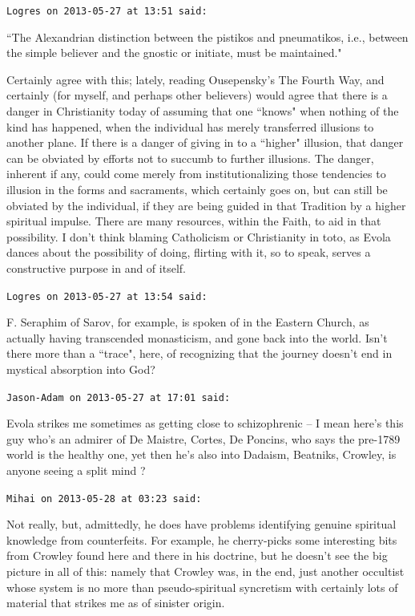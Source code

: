 \begin{footnotesize}
\begin{sffamily}
\hfill

\texttt{Logres on 2013-05-27 at 13:51 said: }

``The Alexandrian distinction between the pistikos and pneumatikos, i.e., between the simple believer and the gnostic or initiate, must be maintained."

Certainly agree with this; lately, reading Ousepensky's The Fourth Way, and certainly (for myself, and perhaps other believers) would agree that there is a danger in Christianity today of assuming that one ``knows" when nothing of the kind has happened, when the individual has merely transferred illusions to another plane. If there is a danger of giving in to a ``higher" illusion, that danger can be obviated by efforts not to succumb to further illusions. The danger, inherent if any, could come merely from institutionalizing those tendencies to illusion in the forms and sacraments, which certainly goes on, but can still be obviated by the individual, if they are being guided in that Tradition by a higher spiritual impulse. There are many resources, within the Faith, to aid in that possibility. I don't think blaming Catholicism or Christianity in toto, as Evola dances about the possibility of doing, flirting with it, so to speak, serves a constructive purpose in and of itself.


\hfill

\texttt{Logres on 2013-05-27 at 13:54 said: }

F. Seraphim of Sarov, for example, is spoken of in the Eastern Church, as actually having transcended monasticism, and gone back into the world. Isn't there more than a ``trace", here, of recognizing that the journey doesn't end in mystical absorption into God?


\hfill

\texttt{Jason-Adam on 2013-05-27 at 17:01 said: }

Evola strikes me sometimes as getting close to schizophrenic – I mean here's this guy who's an admirer of De Maistre, Cortes, De Poncins, who says the pre-1789 world is the healthy one, yet then he's also into Dadaism, Beatniks, Crowley, is anyone seeing a split mind ?


\hfill

\texttt{Mihai on 2013-05-28 at 03:23 said: }

Not really, but, admittedly, he does have problems identifying genuine spiritual knowledge from counterfeits. For example, he cherry-picks some interesting bits from Crowley found here and there in his doctrine, but he doesn't see the big picture in all of this: namely that Crowley was, in the end, just another occultist whose system is no more than pseudo-spiritual syncretism with certainly lots of material that strikes me as of sinister origin.


\end{sffamily}
\end{footnotesize}
